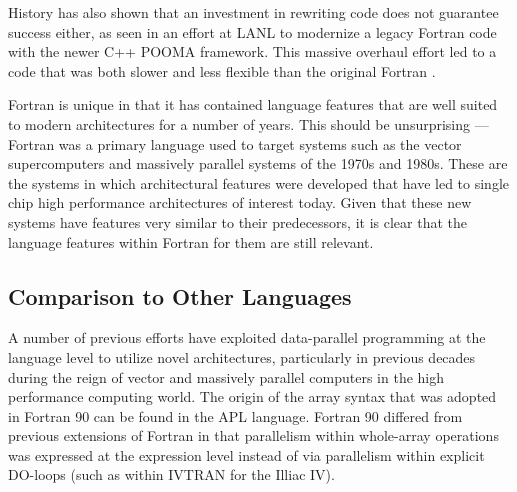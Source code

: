 

History has also shown that an investment in rewriting code does not
guarantee success either, as seen in an effort at LANL to modernize a
legacy Fortran code with the newer C++ POOMA framework.  This
massive overhaul effort led to a code that was both slower and less
flexible than the original Fortran \cite{basili08hpc}.  


Fortran is unique in that it has contained language features that are
well suited to modern architectures for a number of years.  This
should be unsurprising --- Fortran was a primary language used to
target systems such as the vector supercomputers and massively
parallel systems of the 1970s and 1980s.  These are the systems in
which architectural features were developed that have led to single
chip high performance architectures of interest today.  Given that
these new systems have features very similar to their predecessors, it
is clear that the language features within Fortran for them are still
relevant.

\subsection{Comparison to Other Languages}

A number of previous efforts have exploited data-parallel programming
at the language level to utilize novel architectures, particularly in
previous decades during the reign of vector and massively parallel
computers in the high performance computing world.  The origin of the
array syntax that was adopted in Fortran 90 can be found in the APL
language.  Fortran 90 differed from previous %
extensions of Fortran in that parallelism within whole-array
operations was expressed at the expression level instead of via
parallelism within explicit DO-loops (such as within IVTRAN for the
Illiac IV).


